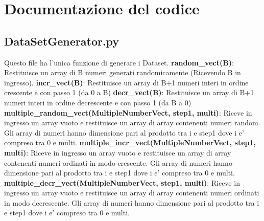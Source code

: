 \documentclass[a4paper]{article}
\begin{document}
\section{Documentazione del codice}
\subsection{DataSetGenerator.py}
Questo file ha l'unica funzione di generare i Dataset.
\textbf{random\_vect(B)}: Restituisce un array di B numeri generati randomicamente (Ricevendo B in ingresso).  
\newline
\textbf{incr\_vect(B)}: Restituisce un array di B+1 numeri interi in ordine crescente e con passo 1 (da 0 a B)
\newline
\textbf{decr\_vect(B)}: Restituisce un array di B+1 numeri interi in ordine decrescente e con passo 1 (da B a 0)
\newline
\textbf{multiple\_random\_vect(MultipleNumberVect, step1, multi)}: Riceve in ingresso un array vuoto e restituisce un array di array contenenti numeri random. Gli array di numeri hanno dimensione pari al prodotto tra i e step1 dove i e' compreso tra 0 e multi.
\newline
\textbf{multiple\_incr\_vect(MultipleNumberVect, step1, multi)}: Riceve in ingresso un array vuoto e restituisce un array di array contenenti numeri ordinati in modo crescente. Gli array di numeri hanno dimensione pari al prodotto tra i e step1 dove i e' compreso tra 0 e multi. 
\newline
\textbf{multiple\_decr\_vect(MultipleNumberVect, step1, multi)}:
Riceve in ingresso un array vuoto e restituisce un array di array contenenti numeri ordinati in modo decrescente. Gli array di numeri hanno dimensione pari al prodotto tra i e step1 dove i e' compreso tra 0 e multi. 
\end{document}
